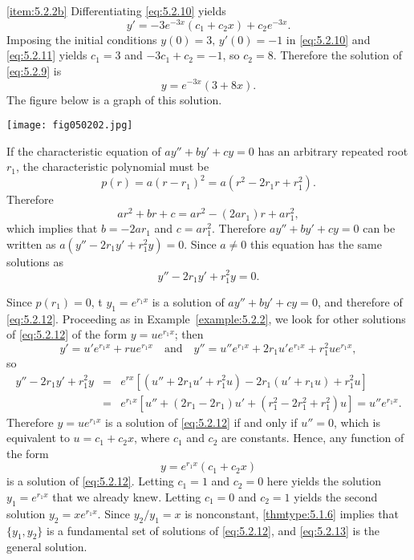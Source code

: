 \documentclass{ximera}
\begin{document}
\begin{example}
\begin{explanation}
\ref{item:5.2.2b}  Differentiating   \eqref{eq:5.2.10} yields
\begin{equation} \label{eq:5.2.11}
y'=-3e^{-3x}(c_1+c_2x)+c_2e^{-3x}.
\end{equation}
Imposing the initial conditions $y(0)=3,\, y'(0)=-1$ in \eqref{eq:5.2.10}
and \eqref{eq:5.2.11} yields $c_1=3$ and $-3c_1+c_2=-1$, so
$c_2=8$. Therefore the solution of \eqref{eq:5.2.9} is
$$
y=e^{-3x}(3+8x).
$$
The figure below is a graph of this solution.
 
\begin{image}
 \texttt{[image: fig050202.jpg]}
\end{image}
 
\end{explanation}
\end{example}
 
 
 
If the characteristic equation of $ay''+by'+cy=0$
has an arbitrary repeated root $r_1$,  the
characteristic polynomial must be
$$
p(r)=a(r-r_1)^2=a(r^2-2r_1r+r_1^2).
$$
Therefore
$$
ar^2+br+c=ar^2-(2ar_1)r+ar_1^2,
$$
which implies that $b=-2ar_1$ and $c=ar_1^2$.
Therefore
 $ay''+by'+cy=0$ can be written as
$a(y''-2r_1y'+r_1^2y)=0$. Since $a\neq 0$ this equation has the same
solutions as
\begin{equation} \label{eq:5.2.12}
y''-2r_1y'+r_1^2y=0.
\end{equation}
 
Since $p(r_1)=0$, t $y_1=e^{r_1x}$ is a solution of
$ay''+by'+cy=0$, and therefore of \eqref{eq:5.2.12}. Proceeding as in
Example~\ref{example:5.2.2}, we look for other solutions of \eqref{eq:5.2.12}
of the form $y=ue^{r_1x}$; then
$$
y'=u'e^{r_1x}+rue^{r_1x}\quad\mbox{and}\quad
y''=u''e^{r_1x}+2r_1u'e^{r_1x}+r_1^2ue^{r_1x},
$$
so
\begin{eqnarray*}
y''-2r_1y'+r_1^2y&=&e^{rx}\left[(u''+2r_1u'+r_1^2u)-
2r_1(u'+r_1u)+r_1^2u\right]\\
&=&e^{r_1x}\left[u''+(2r_1-2r_1)u'+(r_1^2-2r_1^2+r_1^2)u\right]=u''e^{r_1x}.
\end{eqnarray*}
Therefore $y=ue^{r_1x}$ is a solution of \eqref{eq:5.2.12} if and only if
$u''=0$, which is equivalent to $u=c_1+c_2x$, where $c_1$ and $c_2$
are constants. Hence, any function of the form
\begin{equation} \label{eq:5.2.13}
y=e^{r_1x}(c_1+c_2x)
\end{equation}
is  a solution of \eqref{eq:5.2.12}.
Letting $c_1=1$ and $c_2=0$ here yields the solution
 $y_1=e^{r_1x}$ that we already knew. Letting $c_1=0$ and $c_2=1$
yields the second solution $y_2=xe^{r_1x}$. Since
$y_2/y_1=x$
is nonconstant, \ref{thmtype:5.1.6} implies that   $\{y_1,y_2\}$ is
a fundamental set of solutions of \eqref{eq:5.2.12}, and \eqref{eq:5.2.13}
is the general solution.
 
\end{document}
